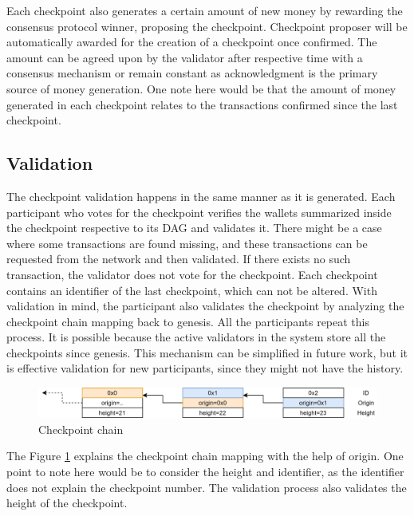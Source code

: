 {%
Each checkpoint also generates a certain amount of new money by rewarding the consensus protocol winner, proposing the checkpoint.  
Checkpoint proposer will be automatically awarded for the creation of a checkpoint once confirmed. The amount can be agreed upon by the validator after respective time with a consensus mechanism or remain constant as acknowledgment is the primary source of money generation.  One note here would be that the amount of money generated in each checkpoint relates to the transactions confirmed since the last checkpoint.
\subsection{Validation}
The checkpoint validation happens in the same manner as it is generated. Each participant who votes for the checkpoint verifies the wallets summarized inside the checkpoint respective to its DAG and validates it. There might be a case where some transactions are found missing, and these transactions can be requested from the network and then validated. If there exists no such transaction, the validator does not vote for the checkpoint. Each checkpoint contains an identifier of the last checkpoint, which can not be altered. With validation in mind, the participant also validates the checkpoint by analyzing the checkpoint chain mapping back to genesis. All the participants repeat this process. It is possible because the active validators in the system store all the checkpoints since genesis. This mechanism can be simplified in future work, but it is effective validation for new participants, since they might not have the history. 
\begin{figure}
    \centering
    \includegraphics[width=125mm,scale=0.5]{figures/drawio/checkpoint_demo.png}
    \caption{Checkpoint chain}
    \label{fig:ckpt_demo}
\end{figure}
The Figure \ref{fig:ckpt_demo} explains the checkpoint chain mapping with the help of origin. One point to note here would be to consider the height and identifier, as the identifier does not explain the checkpoint number. The validation process also validates the height of the checkpoint.
}
